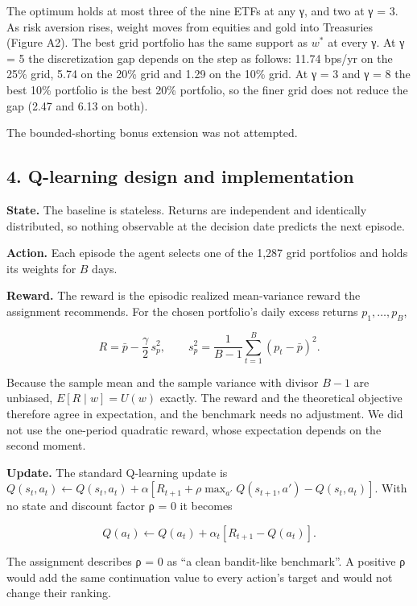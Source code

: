 \documentclass[
  11pt]{article}
\begin{document}
The optimum holds at most three of the nine ETFs at any γ, and two at γ
= 3. As risk aversion rises, weight moves from equities and gold into
Treasuries (Figure A2). The best grid portfolio has the same support as
\(w^*\) at every γ. At γ = 5 the discretization gap depends on the step
as follows: 11.74 bps/yr on the 25\% grid, 5.74 on the 20\% grid and
1.29 on the 10\% grid. At γ = 3 and γ = 8 the best 10\% portfolio is the
best 20\% portfolio, so the finer grid does not reduce the gap (2.47 and
6.13 on both).

The bounded-shorting bonus extension was not attempted.

\subsection{4. Q-learning design and
implementation}\label{q-learning-design-and-implementation}

\textbf{State.} The baseline is stateless. Returns are independent and
identically distributed, so nothing observable at the decision date
predicts the next episode.

\textbf{Action.} Each episode the agent selects one of the 1,287 grid
portfolios and holds its weights for \(B\) days.

\textbf{Reward.} The reward is the episodic realized mean-variance
reward the assignment recommends. For the chosen portfolio's daily
excess returns \(p_1, \dots, p_B\),

\[R = \bar{p} - \frac{\gamma}{2}\, s_p^2, \qquad s_p^2 = \frac{1}{B-1}\sum_{t=1}^{B} (p_t - \bar{p})^2 .\]

Because the sample mean and the sample variance with divisor \(B-1\) are
unbiased, \(E[R \mid w] = U(w)\) exactly. The reward and the theoretical
objective therefore agree in expectation, and the benchmark needs no
adjustment. We did not use the one-period quadratic reward, whose
expectation depends on the second moment.

\textbf{Update.} The standard Q-learning update is
\(Q(s_t,a_t) \leftarrow Q(s_t,a_t) + \alpha\left[R_{t+1} + \rho \max_{a'} Q(s_{t+1},a') - Q(s_t,a_t)\right]\).
With no state and discount factor ρ = 0 it becomes

\[Q(a_t) \leftarrow Q(a_t) + \alpha_t \left[ R_{t+1} - Q(a_t) \right].\]

The assignment describes ρ = 0 as ``a clean bandit-like benchmark''. A
positive ρ would add the same continuation value to every action's
target and would not change their ranking.
\end{document}
